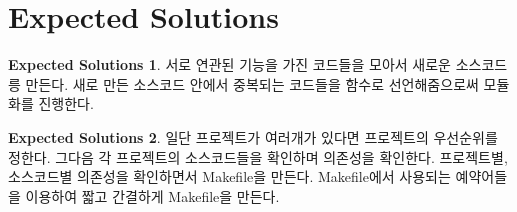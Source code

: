 \documentclass[a4paper, 11pt]{article}
\theoremstyle{definition}
\newtheorem{solution}{Expected Solutions}
\begin{document}
\section{Expected Solutions}

\begin{solution}

서로 연관된 기능을 가진 코드들을 모아서 새로운 소스코드릉 만든다. 새로 만든 소스코드 안에서 중복되는 코드들을 함수로 선언해줌으로써 모듈화를 진행한다.

\end{solution}

\begin{solution}

일단 프로젝트가 여러개가 있다면 프로젝트의 우선순위를 정한다. 그다음 각 프로젝트의 소스코드들을 확인하며 의존성을 확인한다. 프로젝트별, 소스코드별 의존성을 확인하면서 Makefile을 만든다. Makefile에서 사용되는 예약어들을 이용하여 짧고 간결하게 Makefile을 만든다.

\end{solution}



\end{document}
